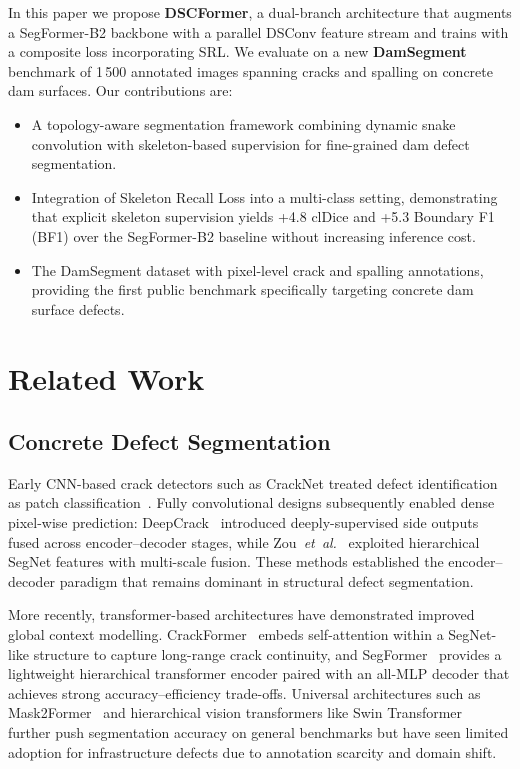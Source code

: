 In this paper we propose \textbf{DSCFormer}, a dual-branch architecture that augments a SegFormer-B2 backbone with a parallel DSConv feature stream and trains with a composite loss incorporating SRL.
We evaluate on a new \textbf{DamSegment} benchmark of 1\,500 annotated images spanning cracks and spalling on concrete dam surfaces.
Our contributions are:
\begin{itemize}
    \item A topology-aware segmentation framework combining dynamic snake convolution with skeleton-based supervision for fine-grained dam defect segmentation.
    \item Integration of Skeleton Recall Loss into a multi-class setting, demonstrating that explicit skeleton supervision yields +4.8 clDice and +5.3 Boundary F1 (BF1) over the SegFormer-B2 baseline without increasing inference cost.
    \item The DamSegment dataset with pixel-level crack and spalling annotations, providing the first public benchmark specifically targeting concrete dam surface defects.
\end{itemize}

\section{Related Work}
\label{sec:related}

\subsection{Concrete Defect Segmentation}
\label{sec:related:defect}

Early CNN-based crack detectors such as CrackNet treated defect identification as patch classification~\cite{zou2019deepcrack}.
Fully convolutional designs subsequently enabled dense pixel-wise prediction: DeepCrack~\cite{liu2019deepcrack} introduced deeply-supervised side outputs fused across encoder--decoder stages, while Zou~\emph{et~al.}~\cite{zou2019deepcrack} exploited hierarchical SegNet features with multi-scale fusion.
These methods established the encoder--decoder paradigm that remains dominant in structural defect segmentation.

More recently, transformer-based architectures have demonstrated improved global context modelling.
CrackFormer~\cite{liu2021crackformer} embeds self-attention within a SegNet-like structure to capture long-range crack continuity, and SegFormer~\cite{xie2021segformer} provides a lightweight hierarchical transformer encoder paired with an all-MLP decoder that achieves strong accuracy--efficiency trade-offs.
Universal architectures such as Mask2Former~\cite{cheng2022mask2former} and hierarchical vision transformers like Swin Transformer~\cite{liu2021swin} further push segmentation accuracy on general benchmarks but have seen limited adoption for infrastructure defects due to annotation scarcity and domain shift.

